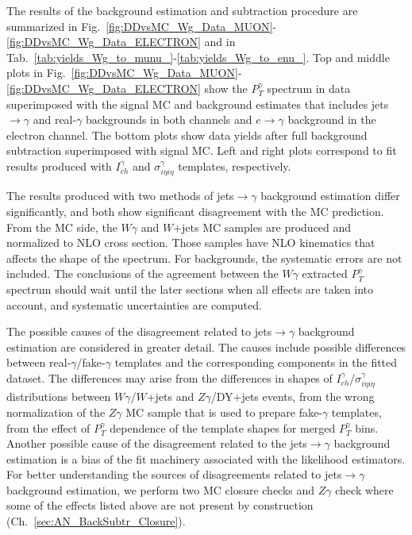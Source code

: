The results of the background estimation and subtraction procedure are summarized in Fig.~\ref{fig:DDvsMC_Wg_Data_MUON}-\ref{fig:DDvsMC_Wg_Data_ELECTRON} and in Tab.~\ref{tab:yields_Wg_to_munu_}-\ref{tab:yields_Wg_to_enu_}. Top and middle plots in Fig.~\ref{fig:DDvsMC_Wg_Data_MUON}-\ref{fig:DDvsMC_Wg_Data_ELECTRON} show the $P_T^\gamma$ spectrum in data superimposed with the signal MC and background estimates that includes jets$\rightarrow\gamma$ and real-$\gamma$ backgrounds in both channels and $e\rightarrow\gamma$ background in the electron channel. The bottom plots show data yields after full background subtraction superimposed with signal MC. Left and right plots correspond to fit results produced with $I_{ch}^{\gamma}$ and $\sigma_{i\eta i\eta}^{\gamma}$ templates, respectively.

The results produced with two methods of jets$\rightarrow\gamma$ background estimation differ significantly, and both show significant disagreement with the MC prediction. From the MC side, the $W\gamma$ and $W$+jets MC samples are produced and normalized to NLO cross section. Those samples have NLO kinematics that affects the shape of the spectrum. For backgrounds, the systematic errors are not included. The conclusions of the agreement between the $W\gamma$ extracted $P_T^{\gamma}$ spectrum should wait until the later sections when all effects are taken into account, and systematic uncertainties are computed.

The possible causes of the disagreement related to jets$\rightarrow\gamma$ background estimation are considered in greater detail. The causes include possible differences between real-$\gamma$/fake-$\gamma$ templates and the corresponding components in the fitted dataset. The differences may arise from the differences in shapes of $I_{ch}^{\gamma}$/$\sigma_{i\eta i\eta}^{\gamma}$ distributions between $W\gamma$/$W$+jets and $Z\gamma$/DY+jets events, from the wrong normalization of the $Z\gamma$ MC sample that is used to prepare fake-$\gamma$ templates, from the effect of $P_T^{\gamma}$ dependence of the template shapes for merged $P_T^{\gamma}$ bins. Another possible cause of the disagreement related to the jets$\rightarrow\gamma$ background estimation is a bias of the fit machinery associated with the likelihood estimators. For better understanding the sources of disagreements related to jets$\rightarrow\gamma$ background estimation, we perform two MC closure checks and $Z\gamma$ check where some of the effects listed above are not present by construction (Ch.~\ref{sec:AN_BackSubtr_Closure}).

